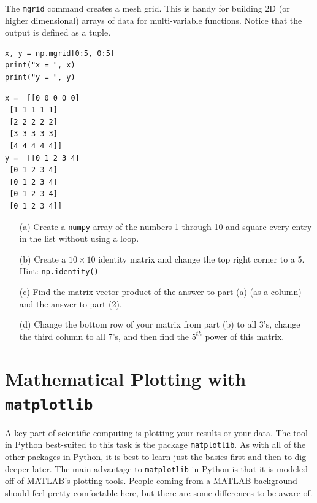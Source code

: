 \begin{example}[Mgrid]
    The \texttt{mgrid} command creates a mesh grid.  This is handy for building 2D (or
    higher dimensional) arrays of data for multi-variable functions.  Notice that the
    output is defined as a tuple.

\bcode
\begin{lstlisting}
x, y = np.mgrid[0:5, 0:5]
print("x = ", x)
print("y = ", y)
\end{lstlisting}
\boutput
\begin{lstlisting}
x =  [[0 0 0 0 0]
 [1 1 1 1 1]
 [2 2 2 2 2]
 [3 3 3 3 3]
 [4 4 4 4 4]]
y =  [[0 1 2 3 4]
 [0 1 2 3 4]
 [0 1 2 3 4]
 [0 1 2 3 4]
 [0 1 2 3 4]]
\end{lstlisting}
\end{example}

\begin{problem}
    \begin{enumerate}
        \item[(a)] Create a \texttt{numpy} array of the numbers 1 through 10 and square every entry in the list without using a loop.
        \item[(b)] Create a $10 \times 10$ identity matrix and change the top right corner
            to a 5.  Hint: \texttt{np.identity()}
        \item[(c)] Find the matrix-vector product of the answer to part (a) (as a column) and the answer to part (2).
        \item[(d)] Change the bottom row of your matrix from part (b) to all 3's, change the third column to all 7's, and then find the $5^{th}$ power of this matrix.
    \end{enumerate}
\end{problem}


\section{Mathematical Plotting with \texttt{matplotlib}}
A key part of scientific computing is plotting your results or your data.  The tool in
Python best-suited to this task is the package \texttt{matplotlib}.  As with all of the
other packages in Python, it is best to learn just the basics first and then to dig deeper
later.  The main advantage to \texttt{matplotlib} in Python is that it is modeled off of
MATLAB's plotting tools.  People coming from a MATLAB background should feel pretty
comfortable here, but there are some differences to be aware of.

